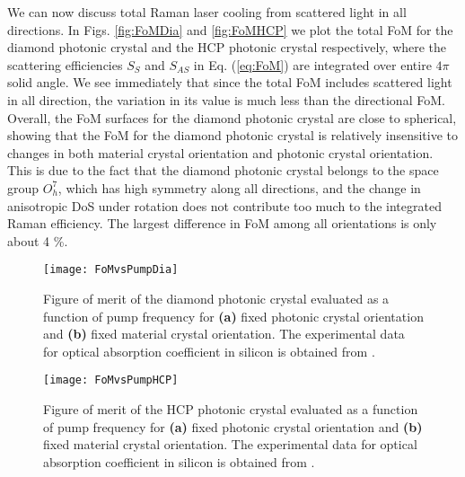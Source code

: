 \documentclass[%
 reprint,
superscriptaddress,
 amsmath,amssymb,
 aps,
pra,
]{revtex4-1}
\begin{document}
\vspace{10pt}



We can now discuss total Raman laser cooling from scattered light in all directions. In Figs. \ref{fig:FoMDia} and \ref{fig:FoMHCP} we plot the total FoM for the diamond photonic crystal and the HCP photonic crystal respectively, where the scattering efficiencies $S_S$ and $S_{AS}$ in Eq. (\ref{eq:FoM}) are integrated over entire $4\pi$ solid angle. We see immediately that since the total FoM includes scattered light in all direction, the variation in its value is much less than the directional FoM. Overall, the FoM surfaces for the diamond photonic crystal are close to spherical, showing that the FoM for the diamond photonic crystal is relatively insensitive to changes in both material crystal orientation and photonic crystal orientation. This is due to the fact that the diamond photonic crystal belongs to the space group $O_h^7$, which has high symmetry along all directions, and the change in anisotropic DoS under rotation does not contribute too much to the integrated Raman efficiency. The largest difference in FoM among all orientations is only about 4 \%.

\begin{figure*}[!ht]
\begin{center}
\texttt{[image: FoMvsPumpDia]}
\caption{Figure of merit of the diamond photonic crystal evaluated as a function of pump frequency for \textbf{(a)} fixed photonic crystal orientation and \textbf{(b)} fixed material crystal orientation. The experimental data for optical absorption coefficient in silicon is obtained from \cite{green2008self}.}
\label{fig:FoMvsPumpDia}
\end{center}
\end{figure*}

\begin{figure*}[!ht]
\begin{center}
\texttt{[image: FoMvsPumpHCP]}
\caption{Figure of merit of the HCP photonic crystal evaluated as a function of pump frequency for \textbf{(a)} fixed photonic crystal orientation and \textbf{(b)} fixed material crystal orientation. The experimental data for optical absorption coefficient in silicon is obtained from \cite{green2008self}.}
\label{fig:FoMvsPumpHCP}
\end{center}
\end{figure*}
\end{document}
